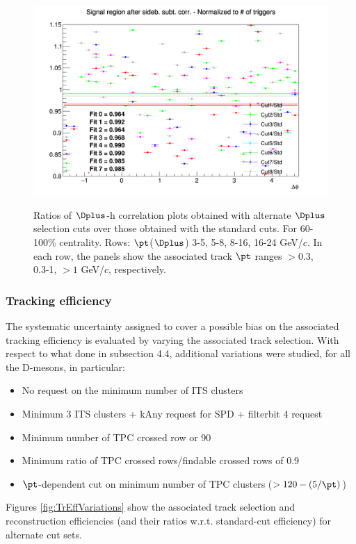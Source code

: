 \begin{figure}
{\includegraphics[width=0.31\linewidth]{Centrality_DPlus/Dplus/Systematic/60_100/Cut/Ratio_AzimCorrDistr_Dplus_Canvas_PtIntBins11to11_PoolInt_thr1dotto99dot.png}} \\
 \caption{Ratios of $\Dplus$-h correlation plots obtained with alternate $\Dplus$ selection cuts over those obtained with the standard cuts. For 60-100\% centrality. Rows: $\pt$($\Dplus$) 3-5, 5-8, 8-16, 16-24 GeV/$c$. In each row, the panels show the associated track
$\pt$ ranges $> 0.3$, 0.3-1, $> 1$ GeV/$c$, respectively.}
\label{fig:SysDcut60100_Dplus}
\end{figure}

\subsubsection{Tracking efficiency}
The systematic uncertainty assigned to cover a possible bias on the associated tracking efficiency is evaluated by varying the associated track selection.
With respect to what done in subsection 4.4, additional variations were studied, for all the D-mesons, in particular:
\begin{itemize}
  \item No request on the minimum number of ITS clusters
  \item Minimum 3 ITS clusters + kAny request for SPD + filterbit 4 request
  \item Minimum number of TPC crossed row or 90
  \item Minimum ratio of TPC crossed rows/findable crossed rows of 0.9
  \item $\pt$-dependent cut on minimum number of TPC clusters ($> 120-(5/\pt)$)
\end{itemize}

Figures \ref{fig:TrEffVariations} show the associated track selection and reconstruction efficiencies (and their ratios w.r.t. standard-cut efficiency) for alternate cut sets.

